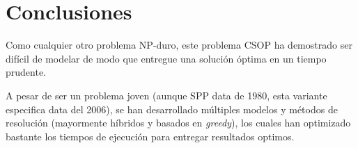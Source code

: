 \section{Conclusiones}

Como cualquier otro problema NP-duro, este problema CSOP ha demostrado ser difícil de modelar de modo que entregue una solución óptima en un tiempo prudente. 

A pesar de ser un problema joven (aunque SPP data de 1980, esta variante especifica data del 2006), se han desarrollado múltiples modelos y métodos de resolución (mayormente híbridos y basados en \textit{greedy}), los cuales han optimizado bastante los tiempos de ejecución para entregar resultados optimos.
